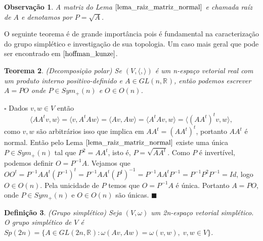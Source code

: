 \documentclass[12pt]{book}
\newtheorem{teorema}{Teorema}[section]
\newtheorem{definicao}[teorema]{Definição}
\newtheorem{observacao}[teorema]{Observação}
\newenvironment{prova}[1]{$\square$ #1}{\hfill$\blacksquare$}
\newcommand{\generalgroup}[2]{GL(#1, #2)}
\newcommand{\generalgroupreal}[1]{\generalgroup{#1}{\real{}}}
\newcommand{\gruposimpletico}[1]{Sp(#1)}
\newcommand{\matrizortogonal}[1]{O(#1)}
\newcommand{\matrizsimetricapositiva}[1]{Sym_{+}(#1)}
\newcommand{\produtointerno}[2]{\langle #1, #2 \rangle}
\newcommand{\real}[1]{\mathbb{R}^{#1}}
\begin{document}
	\begin{observacao}\label{observacao_raiz_matriz_normal}
		A matriz do Lema $\ref{lema_raiz_matriz_normal}$ e chamada raíz de $A$ e denotamos por $P=\sqrt{A}$.
	\end{observacao}
	
	O seguinte teorema é de grande importância pois é fundamental na caracterização do grupo simplético e investigação de sua topologia. Um caso mais geral que pode ser encontrado em $\cite{hoffman_kunze}$.
	
	\begin{teorema}\label{teorema_decomposicao_polar}
		(Decomposição polar) Se $(V, \produtointerno{}{})$ é um n-espaço vetorial real com um produto interno positivo-definido e $A \in \generalgroupreal{n}$, então podemos escrever $A=PO$ onde $P \in  \matrizsimetricapositiva{n}$ e $O \in \matrizortogonal{n}$.
	\end{teorema}
	\begin{prova}
		Dados $v,w \in V$ então 
		$$
		\produtointerno{AA^{t}v}{w}=\produtointerno{v}{A^{t}Aw}=\produtointerno{Av}{Aw}=\produtointerno{A^{t}Av}{w}=\produtointerno{(AA^{t})^{t} v}{w},
		$$
		como $v,w $ são arbitrários isso que implica em $AA^{t}=(AA^{t})^{t}$, portanto $AA^{t}$ é normal. Então pelo Lema $\ref{lema_raiz_matriz_normal}$ existe uma única $P \in \matrizsimetricapositiva{n}$ tal que $P^{2} = AA^{t}$, isto é, $P = \sqrt{AA^{t}}$. Como $P$ é invertível, podemos definir $O = P^{-1}A$. Vejamos que $OO^{t} = P^{-1}AA^{t}(P^{-1})^{t} = P^{-1}AA^{t}(P^{t})^{-1} = P^{-1}AA^{t}P^{-1} = P^{-1}P^{2}P^{-1} = Id$, logo $O \in \matrizortogonal{n}$. Pela unicidade de $P$ temos que $O=P^{-1}A$ é única. Portanto $A=PO$, onde $P \in \matrizsimetricapositiva{n}$ e $O \in \matrizortogonal{n}$ são únicas.
	\end{prova}
	
	\begin{definicao}
		(Grupo simplético) Seja $(V,\omega)$ um 2n-espaço vetorial simplético. O grupo simplético de $V$ é $\gruposimpletico{2n} = \{A \in \generalgroupreal{2n}: \omega(Av, Aw) = \omega(v, w), \; v,w \in V \}$.
	\end{definicao}
	
\end{document}
